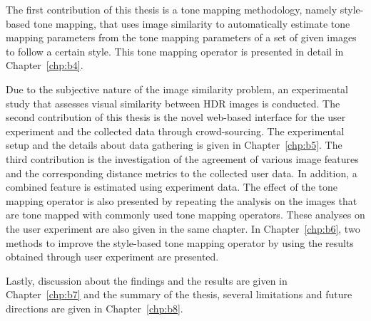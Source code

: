 The first contribution of this thesis is a tone mapping methodology, namely style-based tone mapping, that uses image similarity to automatically estimate tone mapping parameters from the tone mapping parameters of a set of given images to follow a certain style. This tone mapping operator is presented in detail in Chapter~\ref{chp:b4}.


Due to the subjective nature of the image similarity problem, an experimental study that assesses visual similarity between HDR images is conducted. The second contribution of this thesis is the novel web-based interface for the user experiment and the collected data through crowd-sourcing. The experimental setup and the details about data gathering is given in Chapter~\ref{chp:b5}. The third contribution is the investigation of the agreement of various image features and the corresponding distance metrics to the collected user data. In addition, a combined feature is estimated using experiment data. The effect of the tone mapping operator is also presented by repeating the analysis on the images that are tone mapped with commonly used tone mapping operators. These analyses on the user experiment are also given in the same chapter. In Chapter~\ref{chp:b6}, two methods to improve the style-based tone mapping operator by using the results obtained through user experiment are presented.

Lastly, discussion about the findings and the results are given in Chapter~\ref{chp:b7} and the summary of the thesis, several limitations and future directions are given in Chapter~\ref{chp:b8}.






